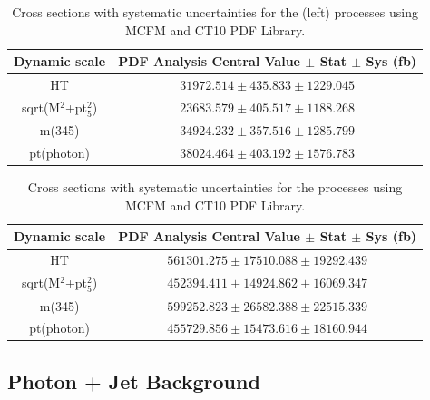 \begin{table}[h!]
\caption[]{Cross sections with systematic uncertainties for the \zinvg (left) processes using MCFM and CT10 PDF Library.}
\label{tab:znng}
\begin{center}
\begin{tabular}{ |c|c| } \hline
Dynamic scale  & PDF Analysis Central Value $\pm$ Stat $\pm$ Sys (fb) \\ \hline \hline
HT &  $ 31972.514  \pm  435.833 \pm  1229.045$ \\ \hline 
sqrt(M$^2$+pt$_5^2$) & $23683.579 \pm 405.517 \pm 1188.268$\\ \hline
m(345)  &  $34924.232 \pm 357.516 \pm 1285.799$\\ \hline
pt(photon)  & $ 38024.464 \pm 403.192 \pm 1576.783$\\ \hline \hline
\end{tabular}
\end{center}
\end{table}

\begin{table}[h!]
\caption[]{Cross sections with systematic uncertainties for the  \winlvg processes using MCFM and CT10 PDF Library.}
\label{tab:wg}
\begin{center}
\begin{tabular}{|c|c|} \hline 
Dynamic scale  & PDF Analysis Central Value $\pm$ Stat $\pm$ Sys (fb) \\ \hline \hline
HT &  $ 561301.275 \pm  17510.088 \pm  19292.439$ \\ \hline
sqrt(M$^2$+pt$_5^2$) & $452394.411 \pm 14924.862 \pm 16069.347 $\\ \hline
m(345)  &  $ 599252.823 \pm 26582.388 \pm 22515.339$\\ \hline
pt(photon)  & $ 455729.856 \pm 15473.616 \pm 18160.944$\\ \hline \hline
\end{tabular}
\end{center}
\end{table}


\subsection{Photon + Jet Background}


